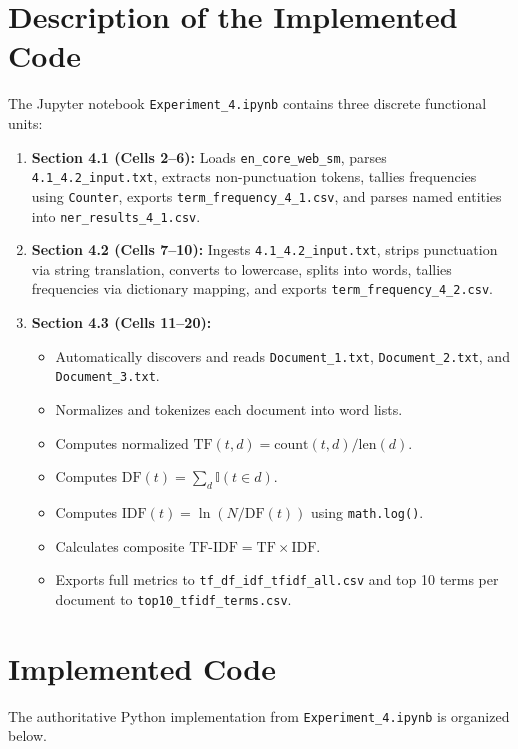 \section{Description of the Implemented Code}
The Jupyter notebook \texttt{Experiment\_4.ipynb} contains three discrete functional units:
\begin{enumerate}
    \item \textbf{Section 4.1 (Cells 2--6):} Loads \texttt{en\_core\_web\_sm}, parses \texttt{4.1\_4.2\_input.txt}, extracts non-punctuation tokens, tallies frequencies using \texttt{Counter}, exports \texttt{term\_frequency\_4\_1.csv}, and parses named entities into \texttt{ner\_results\_4\_1.csv}.
    \item \textbf{Section 4.2 (Cells 7--10):} Ingests \texttt{4.1\_4.2\_input.txt}, strips punctuation via string translation, converts to lowercase, splits into words, tallies frequencies via dictionary mapping, and exports \texttt{term\_frequency\_4\_2.csv}.
    \item \textbf{Section 4.3 (Cells 11--20):}
    \begin{itemize}
        \item Automatically discovers and reads \texttt{Document\_1.txt}, \texttt{Document\_2.txt}, and \texttt{Document\_3.txt}.
        \item Normalizes and tokenizes each document into word lists.
        \item Computes normalized $\text{TF}(t, d) = \text{count}(t, d) / \text{len}(d)$.
        \item Computes $\text{DF}(t) = \sum_{d} \mathbb{I}(t \in d)$.
        \item Computes $\text{IDF}(t) = \ln(N / \text{DF}(t))$ using \texttt{math.log()}.
        \item Calculates composite $\text{TF-IDF} = \text{TF} \times \text{IDF}$.
        \item Exports full metrics to \texttt{tf\_df\_idf\_tfidf\_all.csv} and top 10 terms per document to \texttt{top10\_tfidf\_terms.csv}.
    \end{itemize}
\end{enumerate}

\section{Implemented Code}
The authoritative Python implementation from \texttt{Experiment\_4.ipynb} is organized below.

